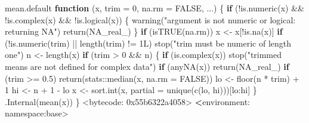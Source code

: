 \documentclass[
  10pt,
  a4paper]{book}
\newenvironment{Shaded}{\begin{snugshade}}{\end{snugshade}}
\newcommand{\AttributeTok}[1]{\textcolor[rgb]{0.77,0.63,0.00}{#1}}
\newcommand{\ConstantTok}[1]{\textcolor[rgb]{0.00,0.00,0.00}{#1}}
\newcommand{\ControlFlowTok}[1]{\textcolor[rgb]{0.13,0.29,0.53}{\textbf{#1}}}
\newcommand{\DecValTok}[1]{\textcolor[rgb]{0.00,0.00,0.81}{#1}}
\newcommand{\ErrorTok}[1]{\textcolor[rgb]{0.64,0.00,0.00}{\textbf{#1}}}
\newcommand{\FloatTok}[1]{\textcolor[rgb]{0.00,0.00,0.81}{#1}}
\newcommand{\FunctionTok}[1]{\textcolor[rgb]{0.00,0.00,0.00}{#1}}
\newcommand{\NormalTok}[1]{#1}
\newcommand{\OtherTok}[1]{\textcolor[rgb]{0.56,0.35,0.01}{#1}}
\newcommand{\SpecialCharTok}[1]{\textcolor[rgb]{0.00,0.00,0.00}{#1}}
\newcommand{\StringTok}[1]{\textcolor[rgb]{0.31,0.60,0.02}{#1}}
\begin{document}
\begin{Shaded}
\begin{Highlighting}[]
\NormalTok{mean.default}
\ControlFlowTok{function}\NormalTok{ (x, }\AttributeTok{trim =} \DecValTok{0}\NormalTok{, }\AttributeTok{na.rm =} \ConstantTok{FALSE}\NormalTok{, ...) }
\NormalTok{\{}
    \ControlFlowTok{if}\NormalTok{ (}\SpecialCharTok{!}\FunctionTok{is.numeric}\NormalTok{(x) }\SpecialCharTok{\&\&} \SpecialCharTok{!}\FunctionTok{is.complex}\NormalTok{(x) }\SpecialCharTok{\&\&} \SpecialCharTok{!}\FunctionTok{is.logical}\NormalTok{(x)) \{}
        \FunctionTok{warning}\NormalTok{(}\StringTok{"argument is not numeric or logical: returning NA"}\NormalTok{)}
        \FunctionTok{return}\NormalTok{(}\ConstantTok{NA\_real\_}\NormalTok{)}
\NormalTok{    \}}
    \ControlFlowTok{if}\NormalTok{ (}\FunctionTok{isTRUE}\NormalTok{(na.rm)) }
\NormalTok{        x }\OtherTok{\textless{}{-}}\NormalTok{ x[}\SpecialCharTok{!}\FunctionTok{is.na}\NormalTok{(x)]}
    \ControlFlowTok{if}\NormalTok{ (}\SpecialCharTok{!}\FunctionTok{is.numeric}\NormalTok{(trim) }\SpecialCharTok{||} \FunctionTok{length}\NormalTok{(trim) }\SpecialCharTok{!=}\NormalTok{ 1L) }
        \FunctionTok{stop}\NormalTok{(}\StringTok{"\textquotesingle{}trim\textquotesingle{} must be numeric of length one"}\NormalTok{)}
\NormalTok{    n }\OtherTok{\textless{}{-}} \FunctionTok{length}\NormalTok{(x)}
    \ControlFlowTok{if}\NormalTok{ (trim }\SpecialCharTok{\textgreater{}} \DecValTok{0} \SpecialCharTok{\&\&}\NormalTok{ n) \{}
        \ControlFlowTok{if}\NormalTok{ (}\FunctionTok{is.complex}\NormalTok{(x)) }
            \FunctionTok{stop}\NormalTok{(}\StringTok{"trimmed means are not defined for complex data"}\NormalTok{)}
        \ControlFlowTok{if}\NormalTok{ (}\FunctionTok{anyNA}\NormalTok{(x)) }
            \FunctionTok{return}\NormalTok{(}\ConstantTok{NA\_real\_}\NormalTok{)}
        \ControlFlowTok{if}\NormalTok{ (trim }\SpecialCharTok{\textgreater{}=} \FloatTok{0.5}\NormalTok{) }
            \FunctionTok{return}\NormalTok{(stats}\SpecialCharTok{::}\FunctionTok{median}\NormalTok{(x, }\AttributeTok{na.rm =} \ConstantTok{FALSE}\NormalTok{))}
\NormalTok{        lo }\OtherTok{\textless{}{-}} \FunctionTok{floor}\NormalTok{(n }\SpecialCharTok{*}\NormalTok{ trim) }\SpecialCharTok{+} \DecValTok{1}
\NormalTok{        hi }\OtherTok{\textless{}{-}}\NormalTok{ n }\SpecialCharTok{+} \DecValTok{1} \SpecialCharTok{{-}}\NormalTok{ lo}
\NormalTok{        x }\OtherTok{\textless{}{-}} \FunctionTok{sort.int}\NormalTok{(x, }\AttributeTok{partial =} \FunctionTok{unique}\NormalTok{(}\FunctionTok{c}\NormalTok{(lo, hi)))[lo}\SpecialCharTok{:}\NormalTok{hi]}
\NormalTok{    \}}
    \FunctionTok{.Internal}\NormalTok{(}\FunctionTok{mean}\NormalTok{(x))}
\NormalTok{\}}
\SpecialCharTok{\textless{}}\NormalTok{bytecode}\SpecialCharTok{:} \DecValTok{0x55b6322a4058}\SpecialCharTok{\textgreater{}}
\ErrorTok{\textless{}}\NormalTok{environment}\SpecialCharTok{:}\NormalTok{ namespace}\SpecialCharTok{:}\NormalTok{base}\SpecialCharTok{\textgreater{}}
\end{Highlighting}
\end{Shaded}
\end{document}
